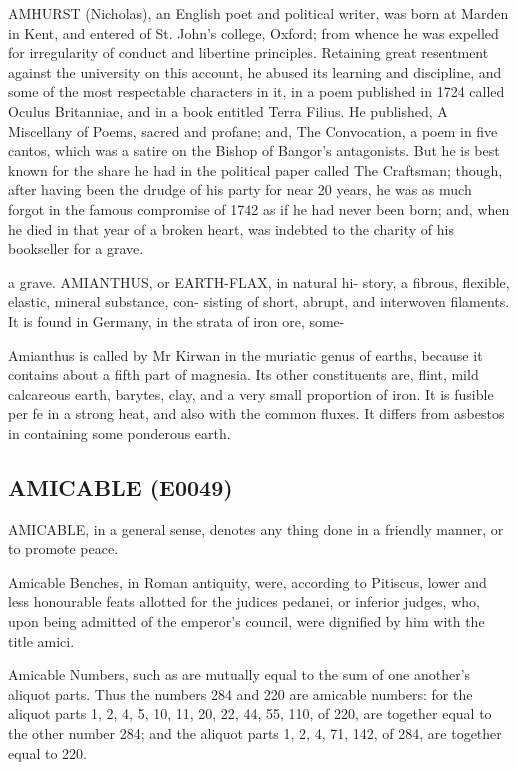 \documentclass{article}
\begin{document}
AMHURST (Nicholas), an English poet and political writer, was born at Marden in Kent, and entered of St. John's college, Oxford; from whence he was expelled for irregularity of conduct and libertine principles. Retaining great resentment against the university on this account, he abused its learning and discipline, and some of the most respectable characters in it, in a poem published in 1724 called Oculus Britanniae, and in a book entitled Terra Filius. He published, A Miscellany of Poems, sacred and profane; and, The Convocation, a poem in five cantos, which was a satire on the Bishop of Bangor's antagonists. But he is best known for the share he had in the political paper called The Craftsman; though, after having been the drudge of his party for near 20 years, he was as much forgot in the famous compromise of 1742 as if he had never been born; and, when he died in that year of a broken heart, was indebted to the charity of his bookseller for a grave.

a grave.
AMIANTHUS, or EARTH-FLAX, in natural hi-
story, a fibrous, flexible, elastic, mineral substance, con-
sisting of short, abrupt, and interwoven filaments. It
is found in Germany, in the strata of iron ore, some-

Amianthus is called by Mr Kirwan in the muriatic genus of earths, because it contains about a fifth part of magnesia. Its other constituents are, flint, mild calcareous earth, barytes, clay, and a very small proportion of iron. It is fusible per fe in a strong heat, and also with the common fluxes. It differs from asbestos in containing some ponderous earth.

\subsection*{AMICABLE (E0049)}
AMICABLE, in a general sense, denotes any thing done in a friendly manner, or to promote peace.

Amicable Benches, in Roman antiquity, were, according to Pitiscus, lower and less honourable feats allotted for the judices pedanei, or inferior judges, who, upon being admitted of the emperor's council, were dignified by him with the title amici.

Amicable Numbers, such as are mutually equal to the sum of one another's aliquot parts. Thus the numbers 284 and 220 are amicable numbers: for the aliquot parts 1, 2, 4, 5, 10, 11, 20, 22, 44, 55, 110, of 220, are together equal to the other number 284; and the aliquot parts 1, 2, 4, 71, 142, of 284, are together equal to 220.
\end{document}
